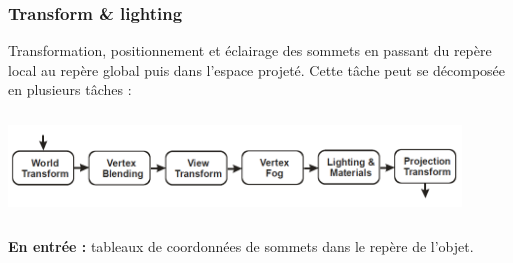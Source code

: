 \subsubsection{Transform \& lighting}
Transformation, positionnement et éclairage des sommets en passant du repère local au repère global puis dans l’espace projeté.
Cette tâche peut se décomposée en plusieurs tâches :
\\
\includegraphics[width=12cm,height=35mm]{leo/images/T&L.png}
\\
\textbf{En entrée :} tableaux de coordonnées de sommets dans le repère de l’objet.
\\
